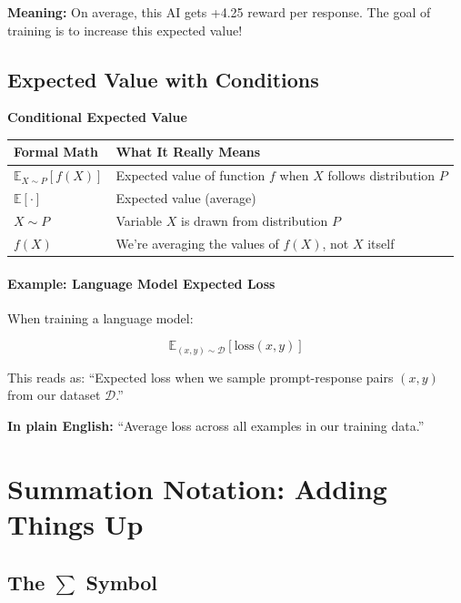 \begin{chapterenv}
\textbf{Meaning:} On average, this AI gets +4.25 reward per response. The goal of training is to increase this expected value!

\subsection{Expected Value with Conditions}

\begin{infobox}
\textbf{Conditional Expected Value}

\begin{center}
\begin{tabular}{p{}p{}}
\toprule
\textbf{Formal Math} & \textbf{What It Really Means} \\
\midrule
$\mathbb{E}_{X \sim P}[f(X)]$ & Expected value of function $f$ when $X$ follows distribution $P$ \\
\midrule
$\mathbb{E}[\cdot]$ & Expected value (average) \\
$X \sim P$ & Variable $X$ is drawn from distribution $P$ \\
$f(X)$ & We're averaging the values of $f(X)$, not $X$ itself \\
\bottomrule
\end{tabular}
\end{center}
\end{infobox}

\paragraph{Example: Language Model Expected Loss}

When training a language model:

\[\mathbb{E}_{(x,y) \sim \mathcal{D}}[\text{loss}(x,y)]\]

This reads as: ``Expected loss when we sample prompt-response pairs $(x,y)$ from our dataset $\mathcal{D}$.''

\textbf{In plain English:} ``Average loss across all examples in our training data.''

\section{Summation Notation: Adding Things Up}

\subsection{The $\sum$ Symbol}


\end{chapterenv}
